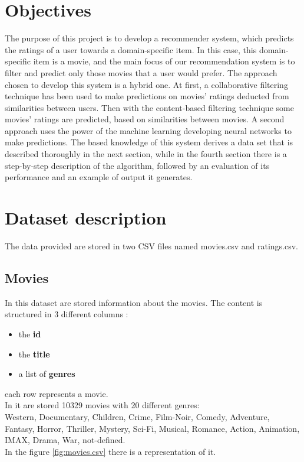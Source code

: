 \documentclass{article}
\begin{document}
\newpage

\section{Objectives}

The purpose of this project is to develop a recommender system, which predicts the ratings of a user towards a domain-specific item. In this case, this domain-specific item is a movie, and the main focus of our recommendation system is to filter and predict only those movies that a user would prefer. The approach chosen to develop this system is a hybrid one. At first, a collaborative filtering technique has been used to make predictions on movies' ratings deducted from similarities between users. Then with the content-based filtering technique some movies' ratings are predicted, based on similarities between movies. A second approach uses the power of the machine learning developing neural networks to make predictions. The based knowledge of this system derives a data set that is described thoroughly in the next section, while in the fourth section there is a step-by-step description of the algorithm, followed by an evaluation of its performance and an example of output it generates.

\section{Dataset description}
The data provided are stored in two CSV files named movies.csv and ratings.csv.

\subsection{Movies}
In this dataset are stored information about the movies. The content is structured in 3 different columns : 
\begin{itemize}
      \item the \textbf{id}
      \item the \textbf{title}
      \item a list of \textbf{genres}
\end{itemize}
each row represents a movie.\\ In it are stored 10329 movies with 20 different genres:\\ Western, Documentary, Children, Crime, Film-Noir, Comedy, Adventure, Fantasy, Horror, Thriller, Mystery, Sci-Fi, Musical, Romance, Action, Animation, IMAX, Drama, War, not-defined. \\
In the figure \ref{fig:movies.csv} there is a representation of it.
\end{document}
